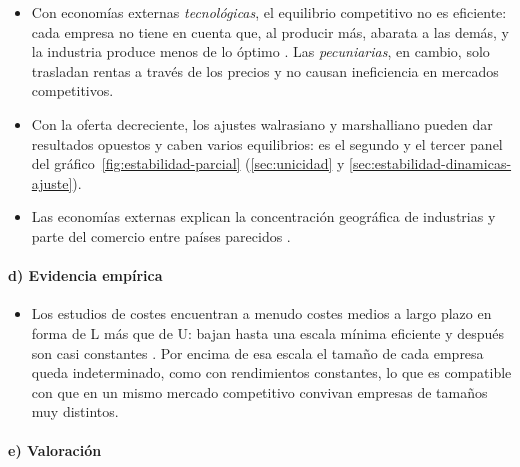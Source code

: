 \documentclass[11pt]{article}
\begin{document}
\begin{itemize}
\item Con economías externas \emph{tecnológicas}, el equilibrio competitivo no es eficiente: cada empresa no tiene en cuenta que, al producir más, abarata a las demás, y la industria produce menos de lo óptimo . Las \emph{pecuniarias}, en cambio, solo trasladan rentas a través de los precios y no causan ineficiencia en mercados competitivos\nocite{Scitovsky1954Two}.
\item Con la oferta decreciente, los ajustes walrasiano y marshalliano pueden dar resultados opuestos y caben varios equilibrios: es el segundo y el tercer panel del gráfico~\ref{fig:estabilidad-parcial} (\ref{sec:unicidad} y \ref{sec:estabilidad-dinamicas-ajuste}).
\item Las economías externas explican la concentración geográfica de industrias y parte del comercio entre países parecidos .
\end{itemize}

\paragraph{d) Evidencia empírica}

\begin{itemize}
\item Los estudios de costes encuentran a menudo costes medios a largo plazo en forma de L más que de U: bajan hasta una escala mínima eficiente y después son casi constantes\nocite{Johnston1960Statistical,Stigler1958Economies} . Por encima de esa escala el tamaño de cada empresa queda indeterminado, como con rendimientos constantes, lo que es compatible con que en un mismo mercado competitivo convivan empresas de tamaños muy distintos.
\end{itemize}

\paragraph{e) Valoración}
\end{document}
